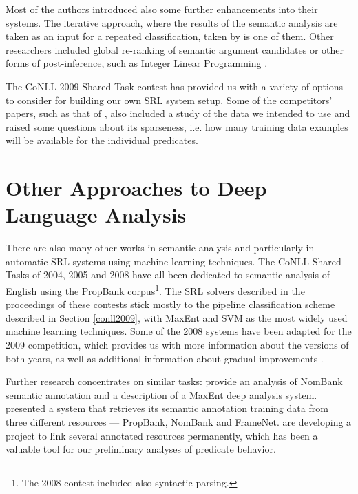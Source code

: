 \documentclass[12pt,notitlepage]{report}
\begin{document}
Most of the authors introduced also some further enhancements into their systems. The iterative approach, where the results of the semantic analysis are taken as an input for a repeated classification, taken by \citet{chen09} is one of them. Other researchers included global re-ranking of semantic argument candidates \citep{nugues09} or other forms of post-inference, such as Integer Linear Programming \citep{che09}.

The CoNLL 2009 Shared Task contest has provided us with a variety of options to consider for building our own SRL system setup. Some of the competitors' papers, such as that of \citet{zeman09}, also included a study of the data we intended to use and raised some questions about its sparseness, i.e. how many training data examples will be available for the individual predicates.

\section{Other Approaches to Deep Language Analysis}

There are also many other works in semantic analysis and particularly in automatic SRL systems using machine learning techniques. The CoNLL Shared Tasks of 2004, 2005 \citep{carreras04,carreras05} and 2008 \citep{surdeanu08} have all been dedicated to semantic analysis of English using the PropBank corpus\footnote{The 2008 contest included also syntactic parsing.}. The SRL solvers described in the proceedings of these contests stick mostly to the pipeline classification scheme described in Section \ref{conll2009}, with MaxEnt and SVM as the most widely used machine learning techniques. Some of the 2008 systems have been adapted for the 2009 competition, which provides us with more information about the versions of both years, as well as additional information about gradual improvements \citep{che08,chen08}.

Further research concentrates on similar tasks: \citet{jiang06} provide an analysis of NomBank \citep{meyers04} semantic annotation and a description of a MaxEnt deep analysis system. \citet{giuglea06} presented a system that retrieves its semantic annotation training data from three different resources --- PropBank, NomBank and FrameNet. \citet{loper07} are developing a project to link several annotated resources permanently, which has been a valuable tool for our preliminary analyses of predicate behavior. 
\end{document}
